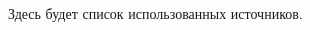 \begingroup
\renewcommand{\section}[2]{\Anonsection{Список использованных источников}}
\begin{thebibliography}{00}

    Здесь будет список использованных источников.

\end{thebibliography}
\endgroup

\clearpage
